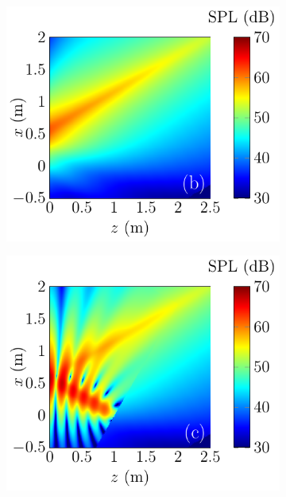 \begin{figure}[!htb]
\begin{subfigure}{0.32\textwidth}
        \includegraphics[width = \textwidth]{fig/ComputePalReflectionTruncated_Ultra60000_LocSurface1m_Absorp50_Image_211013U.pdf}
    \end{subfigure}
    \begin{subfigure}{0.32\textwidth}
        \centering
        \includegraphics[width = \textwidth]{fig/ComputePalReflectionTruncated_Ultra60000_LocSurface1m_Absorp50_Total_211013V.pdf}

\end{subfigure}
\end{figure}
